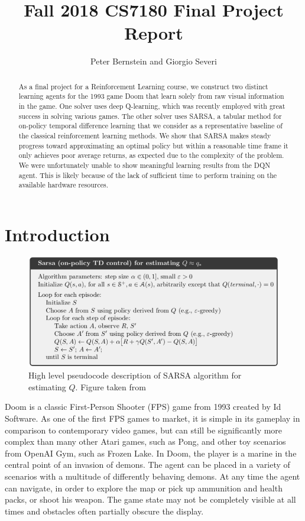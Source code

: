 \documentclass[letterpaper]{article} %
\begin{document}
%
\title{Fall 2018 CS7180 Final Project Report}
\author{Peter Bernstein and Giorgio Severi}
\maketitle
\begin{abstract}
As a final project for a Reinforcement Learning course, we construct two distinct learning agents for the 1993 game Doom that learn solely from raw visual information in the game. One solver uses deep Q-learning, which was recently employed with great success in solving various games. The other solver uses SARSA, a tabular method for on-policy temporal difference learning that we consider as a representative baseline of the classical reinforcement learning methods. We show that SARSA makes steady progress toward approximating an optimal policy but within a reasonable time frame it only achieves poor average returns, as expected due to the complexity of the problem. We were unfortunately unable to show meaningful learning results from the DQN agent. This is likely because of the lack of sufficient time to perform training on the available hardware resources.
\end{abstract}

\section{Introduction}
\begin{figure}[h]
  \centering
  \includegraphics[width = 0.8 \textwidth]{sarsa_algo}
  \caption{High level pseudocode description of SARSA algorithm for estimating $Q$. Figure taken from \cite{sutton_barto}}
  \label{sarsa}
\end{figure}
Doom is a classic First-Person Shooter (FPS) game from 1993 created by Id Software. As one of the first FPS games to market, it is simple in its gameplay in comparison to contemporary video games, but can still be significantly more complex than many other Atari games, such as Pong, and other toy scenarios from OpenAI Gym, such as Frozen Lake. In Doom, the player is a marine in the central point of an invasion of demons. The agent can be placed in a variety of scenarios with a multitude of differently behaving demons. At any time the agent can navigate, in order to explore the map or pick up ammunition and health packs, or shoot his weapon. The game state may not be completely visible at all times and obstacles often partially obscure the display. 
\end{document}
